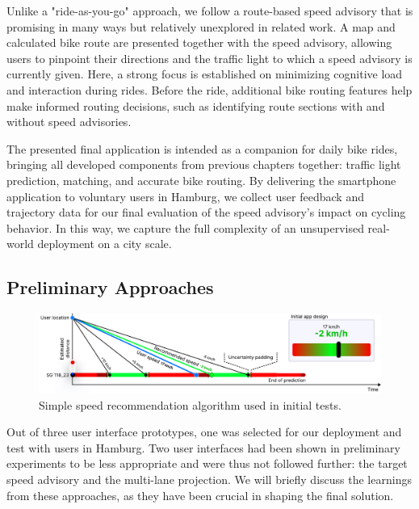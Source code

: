 Unlike a "ride-as-you-go" approach, we follow a route-based speed advisory that is promising in many ways but relatively unexplored in related work. A map and calculated bike route are presented together with the speed advisory, allowing users to pinpoint their directions and the traffic light to which a speed advisory is currently given. Here, a strong focus is established on minimizing cognitive load and interaction during rides. Before the ride, additional bike routing features help make informed routing decisions, such as identifying route sections with and without speed advisories. 

The presented final application is intended as a companion for daily bike rides, bringing all developed components from previous chapters together: traffic light prediction, matching, and accurate bike routing. By delivering the smartphone application to voluntary users in Hamburg, we collect user feedback and trajectory data for our final evaluation of the speed advisory's impact on cycling behavior. In this way, we capture the full complexity of an unsupervised real-world deployment on a city scale.

\subsection{Preliminary Approaches}

\begin{figure}[t]
\centering
\includegraphics[width=\linewidth]{images/graph-based-speed-recommendation.pdf}
\caption{Simple speed recommendation algorithm used in initial tests.}
\label{fig:graph-based-speed-recommendation}
\end{figure}

Out of three user interface prototypes, one was selected for our deployment and test with users in Hamburg. Two user interfaces had been shown in preliminary experiments to be less appropriate and were thus not followed further: the target speed advisory and the multi-lane projection. We will briefly discuss the learnings from these approaches, as they have been crucial in shaping the final solution.

